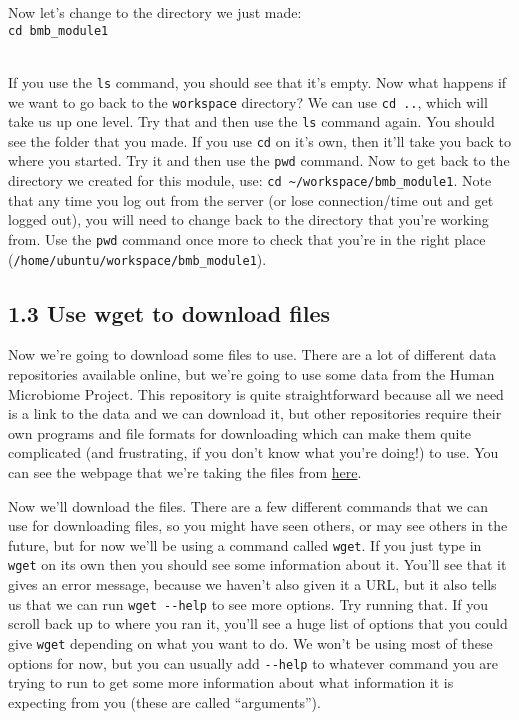 \documentclass[
]{book}
\begin{document}
Now let's change to the directory we just made:\\
\texttt{cd\ bmb\_module1}\strut \\
If you use the \texttt{ls} command, you should see that it's empty. Now what happens if we want to go back to the \texttt{workspace} directory? We can use \texttt{cd\ ..}, which will take us up one level. Try that and then use the \texttt{ls} command again. You should see the folder that you made. If you use \texttt{cd} on it's own, then it'll take you back to where you started. Try it and then use the \texttt{pwd} command. Now to get back to the directory we created for this module, use: \texttt{cd\ \textasciitilde{}/workspace/bmb\_module1}.
Note that any time you log out from the server (or lose connection/time out and get logged out), you will need to change back to the directory that you're working from. Use the \texttt{pwd} command once more to check that you're in the right place (\texttt{/home/ubuntu/workspace/bmb\_module1}).

\subsection{1.3 Use wget to download files}\label{use-wget-to-download-files}

Now we're going to download some files to use. There are a lot of different data repositories available online, but we're going to use some data from the Human Microbiome Project. This repository is quite straightforward because all we need is a link to the data and we can download it, but other repositories require their own programs and file formats for downloading which can make them quite complicated (and frustrating, if you don't know what you're doing!) to use. You can see the webpage that we're taking the files from \href{https://www.ibdmdb.org/downloads/html/rawfiles_16s_2018-01-08.html}{here}.

Now we'll download the files. There are a few different commands that we can use for downloading files, so you might have seen others, or may see others in the future, but for now we'll be using a command called \texttt{wget}. If you just type in \texttt{wget} on its own then you should see some information about it. You'll see that it gives an error message, because we haven't also given it a URL, but it also tells us that we can run \texttt{wget\ -\/-help} to see more options. Try running that. If you scroll back up to where you ran it, you'll see a huge list of options that you could give \texttt{wget} depending on what you want to do. We won't be using most of these options for now, but you can usually add \texttt{-\/-help} to whatever command you are trying to run to get some more information about what information it is expecting from you (these are called ``arguments'').
\end{document}
